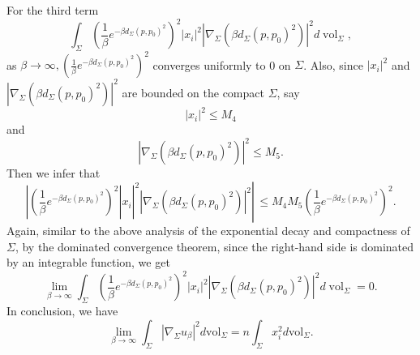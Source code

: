 \documentclass[a4, 12pt]{amsart}
\numberwithin{equation}{section} \numberwithin{equation}{section}
\begin{document}
For the third term
\begin{equation*}\int_{\Sigma}\left(\frac{1}{\beta} e^{-\beta d_{\Sigma}\left(p, p_{0}\right)^{2}}\right)^{2}\left|x_{i}\right|^{2}\left|\nabla_{\Sigma}\left(\beta d_{\Sigma}\left(p, p_{0}\right)^{2}\right)\right|^{2} d \operatorname{vol}_{\Sigma},\end{equation*} as $\beta \rightarrow \infty,\left(\frac{1}{\beta} e^{-\beta d_{\Sigma}\left(p, p_{0}\right)^{2}}\right)^{2}$ converges uniformly to 0 on $\Sigma$. Also, since $\left|x_{i}\right|^{2}$ and $\left|\nabla_{\Sigma}\left(\beta d_{\Sigma}\left(p, p_{0}\right)^{2}\right)\right|^{2}$ are bounded on the compact $\Sigma$, say
\begin{equation*}\left|x_{i}\right|^{2} \leq M_{4}\end{equation*} and
\begin{equation*}\left|\nabla_{\Sigma}\left(\beta d_{\Sigma}\left(p, p_{0}\right)^{2}\right)\right|^{2} \leq M_{5}.\end{equation*} Then we infer that
\begin{equation*}
\left.\left.\left|\left(\frac{1}{\beta} e^{-\beta d_{\Sigma}\left(p, p_{0}\right)^{2}}\right)^{2}\right| x_{i}\right|^{2}\left|\nabla_{\Sigma}\left(\beta d_{\Sigma}\left(p, p_{0}\right)^{2}\right)\right|^{2} \right\rvert\, \leq M_{4} M_{5}\left(\frac{1}{\beta} e^{-\beta d_{\Sigma}\left(p, p_{0}\right)^{2}}\right)^{2}.
\end{equation*}
Again, similar to the above analysis of the exponential decay and compactness of $\Sigma$, by the dominated convergence theorem, since the right-hand side is dominated by an integrable function, we get
\begin{equation*}
\lim _{\beta \rightarrow \infty} \int_{\Sigma}\left(\frac{1}{\beta} e^{-\beta d_{\Sigma}\left(p, p_{0}\right)^{2}}\right)^{2}\left|x_{i}\right|^{2}\left|\nabla_{\Sigma}\left(\beta d_{\Sigma}\left(p, p_{0}\right)^{2}\right)\right|^{2} d \operatorname{vol}_{\Sigma}=0.
\end{equation*}
In conclusion, we have
\begin{equation*}\lim _{\beta \rightarrow \infty} \int_{\Sigma}\left|\nabla _{\Sigma} u_{\beta}\right|^{2} d \mathrm{vol}_{\Sigma}=n \int_{\Sigma} x_{i}^{2} d \mathrm{vol}_{\Sigma}.\end{equation*}
\end{document}
